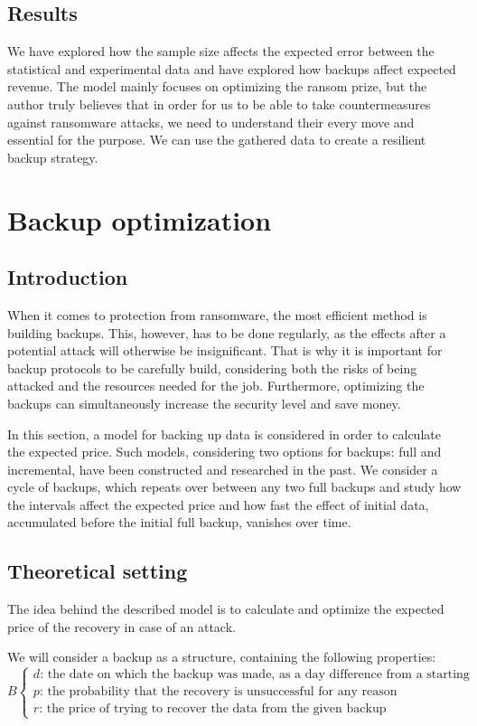 \documentclass[11pt, a4paper]{article}
\theoremstyle{definition}
\begin{document}
		\subsection{Results}
		We have explored how the sample size affects the expected error between the statistical and experimental data and have explored how backups affect expected revenue. The model mainly focuses on optimizing the ransom prize, but the author truly believes that in order for us to be able to take countermeasures against ransomware attacks, we need to understand their every move and essential for the purpose. We can use the gathered data to create a resilient backup strategy.
\section{Backup optimization}
	\subsection{Introduction}
		When it comes to protection from ransomware, the most efficient method is building backups. This, however, has to be done regularly, as the effects after a potential attack will otherwise be insignificant. That is why it is important for backup protocols to be carefully build, considering both the risks of being attacked and the resources needed for the job. Furthermore, optimizing the backups can simultaneously increase the security level and save money.\par
		In this section, a model for backing up data is considered in order to calculate the expected price. Such models, considering two options for backups: full and incremental, have been constructed and researched in the past\cite{nakamura2003optimal}\cite{qian2010optimal}. We consider a cycle of backups, which repeats over between any two full backups and study how the intervals affect the expected price and how fast the effect of initial data, accumulated before the initial full backup, vanishes over time.
	\subsection{Theoretical setting}
		The idea behind the described model is to calculate and optimize the expected price of the recovery in case of an attack.\par
		We will consider a backup as a structure, containing the following properties:
		$$
		B
		\begin{cases}
			d \text{: the date on which the backup was made, as a day difference from a starting point}\\
			p \text{: the probability that the recovery is unsuccessful for any reason}\\
			r \text{: the price of trying to recover the data from the given backup}
		\end{cases}
		$$
		
\end{document}
